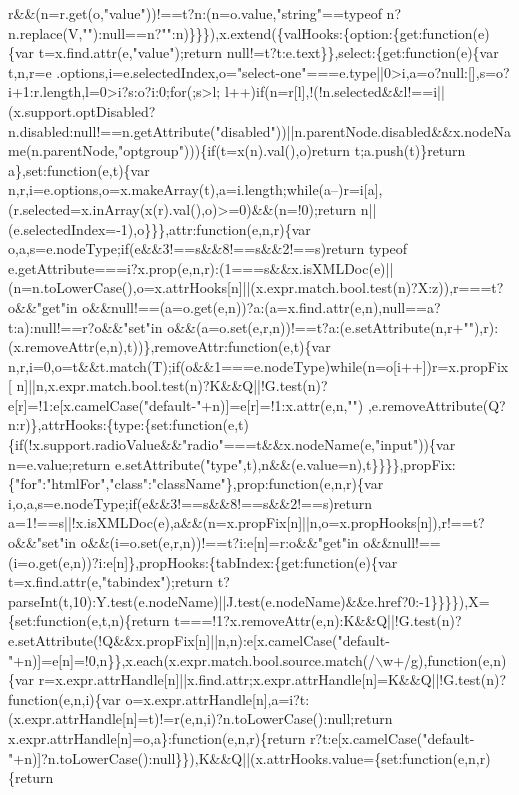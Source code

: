 \begin{DoxyCode}
{       r&&(n=r.get(o,"value"))!==t?n:(n=o.value,"string"==typeof
       n?n.replace(V,""):null==n?"":n)\}\}\}),x.extend(\{valHooks:\{option:\{get:function(e)\{var t=x.find.attr(e,"value");return null!=t?t:e.text\}\},select:\{get:function(e)\{var
       t,n,r=e
      .options,i=e.selectedIndex,o="select-one"===e.type||0>i,a=o?null:[],s=o?i+1:r.length,l=0>i?s:o?i:0;for(;s>l;
      l++)if(n=r[l],!(!n.selected&&l!==i||(x.support.optDisabled?n.disabled:null!==n.getAttribute("disabled"))||n.parentNode.disabled&&x.nodeName(n.parentNode,"optgroup")))\{if(t=x(n).val(),o)return t;a.push(t)\}return
       a\},set:function(e,t)\{var
       n,r,i=e.options,o=x.makeArray(t),a=i.length;while(a--)r=i[a],(r.selected=x.inArray(x(r).val(),o)>=0)&&(n=!0);return n||(e.selectedIndex=-1),o\}\}\},attr:function(e,n,r)\{var
       o,a,s=e.nodeType;if(e&&3!==s&&8!==s&&2!==s)return typeof
       e.getAttribute===i?x.prop(e,n,r):(1===s&&x.isXMLDoc(e)||(n=n.toLowerCase(),o=x.attrHooks[n]||(x.expr.match.bool.test(n)?X:z)),r===t?o&&"get"in
       o&&null!==(a=o.get(e,n))?a:(a=x.find.attr(e,n),null==a?t:a):null!==r?o&&"set"in
       o&&(a=o.set(e,r,n))!==t?a:(e.setAttribute(n,r+""),r):(x.removeAttr(e,n),t))\},removeAttr:function(e,t)\{var
       n,r,i=0,o=t&&t.match(T);if(o&&1===e.nodeType)while(n=o[i++])r=x.propFix[
      n]||n,x.expr.match.bool.test(n)?K&&Q||!G.test(n)?e[r]=!1:e[x.camelCase("default-"+n)]=e[r]=!1:x.attr(e,n,"")
      ,e.removeAttribute(Q?n:r)\},attrHooks:\{type:\{set:function(e,t)\{if(!x.support.radioValue&&"radio"===t&&x.nodeName(e,"input"))\{var n=e.value;return
       e.setAttribute("type",t),n&&(e.value=n),t\}\}\}\},propFix:\{"for":"htmlFor","class":"className"\},prop:function(e,n,r)\{var i,o,a,s=e.nodeType;if(e&&3!==s&&8!==s&&2!==s)return
       a=1!==s||!x.isXMLDoc(e),a&&(n=x.propFix[n]||n,o=x.propHooks[n]),r!==t?o&&"set"in
       o&&(i=o.set(e,r,n))!==t?i:e[n]=r:o&&"get"in o&&null!==(i=o.get(e,n))?i:e[n]\},propHooks:\{tabIndex:\{get:function(e)\{var
       t=x.find.attr(e,"tabindex");return
       t?parseInt(t,10):Y.test(e.nodeName)||J.test(e.nodeName)&&e.href?0:-1\}\}\}\}),X=\{set:function(e,t,n)\{return
       t===!1?x.removeAttr(e,n):K&&Q||!G.test(n)?e.setAttribute(!Q&&x.propFix[n]||n,n):e[x.camelCase("default-"+n)]=e[n]=!0,n\}\},x.each(x.expr.match.bool.source.match(/\(\backslash\)w+/g),function(e,n)\{var
       r=x.expr.attrHandle[n]||x.find.attr;x.expr.attrHandle[n]=K&&Q||!G.test(n)?function(e,n,i)\{var
       o=x.expr.attrHandle[n],a=i?t:(x.expr.attrHandle[n]=t)!=r(e,n,i)?n.toLowerCase():null;return x.expr.attrHandle[n]=o,a\}:function(e,n,r)\{return
       r?t:e[x.camelCase("default-"+n)]?n.toLowerCase():null\}\}),K&&Q||(x.attrHooks.value=\{set:function(e,n,r)\{return
}
\end{DoxyCode}
